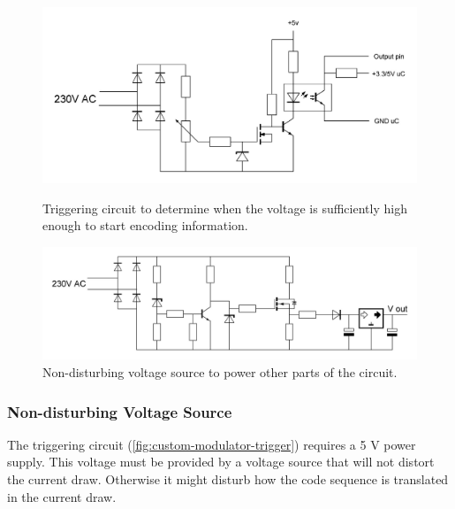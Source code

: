 	\begin{figure}[!tbp]
	  \centering
	  \begin{minipage}[b]{0.48\textwidth}
	    \includegraphics[width=\textwidth]{chapters/hardware-chapters/custom-modulator-trigger.JPG}
	    \caption{Triggering circuit to determine when the voltage is sufficiently high enough to start encoding information.}
		\label{fig:custom-modulator-trigger}
	  \end{minipage}
	  \hfill
	  \begin{minipage}[b]{0.48\textwidth}
	    \includegraphics[width=\textwidth]{chapters/hardware-chapters/custom-modulator-voltage-source.JPG}
	    \caption{Non-disturbing voltage source to power other parts of the circuit.}
		\label{fig:custom-modulator-voltage-source}
	  \end{minipage}
	\end{figure}


	\subsubsection{Non-disturbing Voltage Source}
	\label{subsubsec:non-disturbing-voltage-source}

	The triggering circuit (\autoref{fig:custom-modulator-trigger}) requires a 5 V power supply.
	This voltage must be provided by a voltage source that will not distort the current draw.
	Otherwise it might disturb how the code sequence is translated in the current draw.


